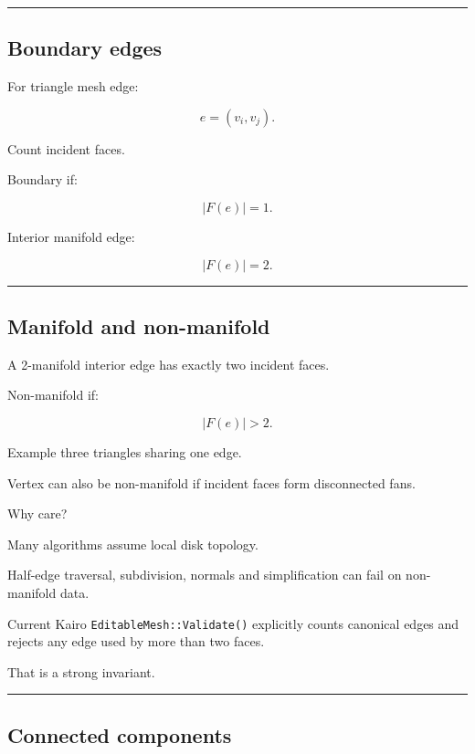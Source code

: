 \begin{center}\rule{0.5\linewidth}{0.5pt}\end{center}

\subsection{Boundary edges}\label{04-visual-computing-ii-ch041-boundary-edges}

For triangle mesh edge:

\[
e=(v_i,v_j).
\]

Count incident faces.

Boundary if:

\[
\boxed{
|F(e)|=1.
}
\]

Interior manifold edge:

\[
|F(e)|=2.
\]

\begin{center}\rule{0.5\linewidth}{0.5pt}\end{center}

\subsection{Manifold and non-manifold}\label{04-visual-computing-ii-ch041-manifold-and-non-manifold}

A 2-manifold interior edge has exactly two incident faces.

Non-manifold if:

\[
|F(e)|>2.
\]

Example three triangles sharing one edge.

Vertex can also be non-manifold if incident faces form disconnected fans.

Why care?

Many algorithms assume local disk topology.

Half-edge traversal, subdivision, normals and simplification can fail on non-manifold data.

Current Kairo \texttt{EditableMesh::Validate()} explicitly counts canonical edges and rejects any edge used by more than two faces.

That is a strong invariant.

\begin{center}\rule{0.5\linewidth}{0.5pt}\end{center}

\subsection{Connected components}\label{04-visual-computing-ii-ch041-connected-components}

